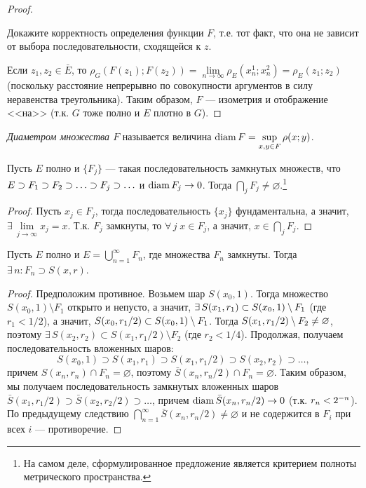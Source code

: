 \documentclass[10pt,titlepage, a4paper]{article}
\begin{document}
\begin{proof}
\begin{upr}
Докажите корректность определения функции $F$, т.е. тот факт, что
она не зависит от выбора последовательности, сходящейся к $z$.
\end{upr}

Если $z_1,z_2\in\bar{E}$, то
$\rho_G(F(z_1);F(z_2))=\lim\limits_{n\to\infty}\rho_E(x_n^1;x_n^2)=\rho_E(z_1;z_2)$
(поскольку расстояние непрерывно по совокупности аргументов в силу
неравенства треугольника). Таким образом, $F$ --- изометрия и
отображение <<на>> (т.к. $G$ тоже полно и $E$ плотно в $G$).
\end{proof}

\begin{defen}
\emph{Диаметром множества $F$} называется величина $\mathop{\mathrm{diam}}
F=\sup\limits_{x,y\in F}\rho(x;y)$.
\end{defen}

\begin{theorem}
Пусть $E$ полно и $\{F_j\}$ --- такая последовательность замкнутых
множеств, что $E\supset F_1\p\supset F_2\supset\ldots\supset
F_j\supset\ldots$ и $\mathop{\mathrm{diam}} F_j\to 0$. Тогда $\bigcap\limits_j
F_j\neq\varnothing$.\footnote{На самом деле, сформулированное
предложение является критерием полноты метрического пространства.}
\end{theorem}

\begin{proof}
Пусть $x_j\in F_j$, тогда последовательность $\{x_j\}$
фундаментальна, а значит, $\exists\,\lim\limits_{j\to\infty}x_j=x$.
Т.к. $F_j$ замкнуты, то $\forall\, j\;x\in F_j$, а значит,
$x\in\bigcap\limits_j F_j$.
\end{proof}

\begin{theorem}[Бэр]\label{th.Ber}
Пусть $E$ полно и $E=\bigcup\limits_{n=1}^\infty F_n$, где множества
$F_n$ замкнуты. Тогда $\exists\,n:F_n\supset S(x,r)$.
\end{theorem}

\begin{proof}
Предположим противное. Возьмем шар $S(x_0,1)$. Тогда множество
$S(x_0,1)\setminus F_1$ открыто и непусто, а значит, $\exists\,
S(x_1,r_1)\subset S(x_0,1)\p\setminus F_1$ (где $r_1<1/2$), а
значит, $S(x_0,r_1/2)\subset S(x_0,1)\p\setminus F_1$. Тогда
$S(x_1,r_1/2)\p\setminus F_2\neq\varnothing$, поэтому
$\exists\,S(x_2,r_2)\subset S(x_1,r_1/2)\setminus F_2$ (где
$r_2<1/4$). Продолжая, получаем последовательность вложенных шаров:
$$S(x_0,1)\supset S(x_1,r_1)\supset S(x_1,r_1/2)\supset
S(x_2,r_2)\supset\ldots,$$ причем $S(x_n,r_n)\cap F_n=\varnothing$,
поэтому $\bar{S}(x_n,r_n/2)\cap F_n=\varnothing$. Таким образом, мы
получаем последовательность замкнутых вложенных шаров
$\bar{S}(x_1,r_1/2)\supset \bar{S}(x_2,r_2/2)\supset \ldots$, причем
$\mathop{\mathrm{diam}} \bar{S}(x_n,r_n/2)\to0$ (т.к. $r_n\p<2^{-n}$). По предыдущему
следствию $\bigcap\limits_{n=1}^\infty
\bar{S}(x_n,r_n/2)\neq\varnothing$ и не содержится в $F_i$ при всех
$i$ --- противоречие.
\end{proof}
\end{document}
